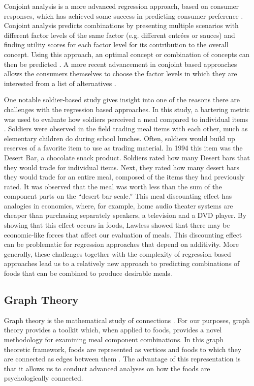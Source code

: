 Conjoint analysis is a more advanced regression approach, based on consumer responses, which has achieved some success in predicting consumer preference \citep{Green1978,Luce1964}.  Conjoint analysis predicts combinations by presenting multiple scenarios with different factor levels of the same factor (e.g. different entrées or sauces) and finding utility scores for each factor level for its contribution to the overall concept.  Using this approach, an optimal concept or combination of concepts can then be predicted \citep{Moskowitz2006a}.  A more recent advancement in conjoint based approaches allows the consumers themselves to choose the factor levels in which they are interested from a list of alternatives \citep{Liechty2001}.

One notable soldier-based study gives insight into one of the reasons there are challenges with the regression based approaches.  In this study, a bartering metric was used to evaluate how soldiers perceived a meal compared to individual items \citep{Lawless1994}.  Soldiers were observed in the field trading meal items with each other, much as elementary children do during school lunches.  Often, soldiers would build up reserves of a favorite item to use as trading material.  In 1994 this item was the Desert Bar, a chocolate snack product.  Soldiers rated how many Desert bars that they would trade for individual items.  Next, they rated how many desert bars they would trade for an entire meal, composed of the items they had previously rated.  It was observed that the meal was worth less than the sum of the component parts on the “desert bar scale.”  This meal discounting effect has analogies in economics, where, for example, home audio theater systems are cheaper than purchasing separately speakers, a television and a DVD player.  By showing that this effect occurs in foods, Lawless showed that there may be economic-like forces that affect our evaluation of meals.  This discounting effect can be problematic for regression approaches that depend on additivity.  More generally, these challenges together with the complexity of regression based approaches lead us to a relatively new approach to predicting combinations of foods that can be combined to produce desirable meals.

\subsection{Graph Theory}

Graph theory is the mathematical study of connections \citep{Bollobaas1998}.  For our purposes, graph theory  provides a toolkit which, when applied to foods, provides a novel methodology for examining meal component combinations.  In this graph theoretic framework, foods are represented as vertices and foods to which they are connected as edges between them \citep{Ennis2011}.  The advantage of this representation is that it allows us to conduct advanced analyses on how the foods are psychologically connected.  

